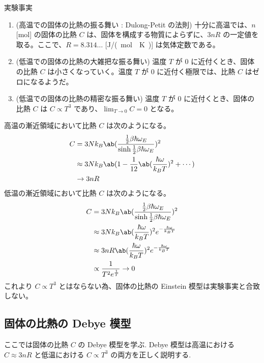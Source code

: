 \documentclass[a4paper,11pt]{jlreq}
\begin{document}
\begin{itembox}[l]{実験事実}
  \begin{enumerate}
    \item (高温での固体の比熱の振る舞い : Dulong-Petit の法則) 十分に高温では、$n$ [\si{mol}] の固体の比熱 $C$ は、固体を構成する物質によらずに、$3nR$ の一定値を取る。ここで、$R = 8.314\ldots$ [\si{J/(mol\cdot K)}] は気体定数である。
    \item (低温での固体の比熱の大雑把な振る舞い) 温度 $T$ が $0$ に近付くとき、固体の比熱 $C$ は小さくなっていく。温度 $T$ が $0$ に近付く極限では、比熱 $C$ はゼロになるようだ。
    \item (低温での固体の比熱の精密な振る舞い) 温度 $T$ が $0$ に近付くとき、固体の比熱 $C$ は $C \propto T^3$ であり、$\lim_{T\to 0} C = 0$ となる。
  \end{enumerate}
\end{itembox}
高温の漸近領域において比熱 $C$ は次のようになる。
\begin{align}
  C & = 3Nk_B\ab(\frac{\frac{1}{2}\beta\hbar\omega_E}{\sinh\frac{1}{2}\beta\hbar\omega_E})^2 \\
    & \approx 3Nk_B\ab(1 - \frac{1}{12}\ab(\frac{\hbar\omega}{k_BT})^2 + \cdots)             \\
    & \to 3nR
\end{align}
低温の漸近領域において比熱 $C$ は次のようになる。
\begin{align}
  C & = 3Nk_B\ab(\frac{\frac{1}{2}\beta\hbar\omega_E}{\sinh\frac{1}{2}\beta\hbar\omega_E})^2 \\
    & \approx 3Nk_B\ab(\frac{\hbar\omega}{k_BT})^2e^{-\frac{\hbar\omega}{k_BT}}              \\
    & \approx 3nR\ab(\frac{\hbar\omega}{k_BT})^2e^{-\frac{\hbar\omega}{k_BT}}                \\
    & \propto \frac{1}{T^{2}e^{\frac{1}{T}}} \to 0
\end{align}
これより $C \propto T^3$ とはならない為、固体の比熱の Einstein 模型は実験事実と合致しない。

\subsection{固体の比熱の Debye 模型}
ここでは固体の比熱 $C$ の Debye 模型を学ぶ. Debye 模型は高温における $C\approx 3nR$ と低温における $C\propto T^3$ の両方を正しく説明する.
\end{document}

